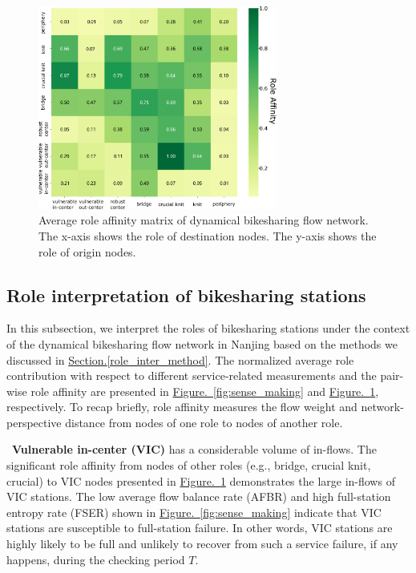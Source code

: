 \documentclass[a4paper,fleqn]{cas-sc}
\begin{document}
\begin{figure}[!htb]
  \centering
  \includegraphics[width=0.7\textwidth]{figs/bikesharing_role_affinity.pdf}
  \caption{Average role affinity matrix of dynamical bikesharing flow network. The x-axis shows the role of destination nodes. The y-axis shows the role of origin nodes.}\label{fig:bikesharing_role_affinity}
\end{figure}


\subsection{Role interpretation of bikesharing stations}
In this subsection, we interpret the roles of bikesharing stations under the context of the dynamical bikesharing flow network in Nanjing based on the methods we discussed in \hyperref[role_inter_method]{Section.\ref{role_inter_method}}. The normalized average role contribution with respect to different service-related measurements and the pair-wise role affinity are presented in \hyperref[fig:role_bikesharing]{Figure.~\ref{fig:sense_making}} and \hyperref[fig:bikesharing_role_affinity]{Figure.~\ref{fig:bikesharing_role_affinity}}, respectively. To recap briefly, role affinity measures the flow weight and network-perspective distance from nodes of one role to nodes of another role.\newline

\noindent \textbullet \, \textbf{Vulnerable in-center (VIC)} has a considerable volume of in-flows. The significant role affinity from nodes of other roles (e.g., bridge, crucial knit, crucial) to VIC nodes presented in \hyperref[fig:bikesharing_role_affinity]{Figure.~\ref{fig:bikesharing_role_affinity}} demonstrates the large in-flows of VIC stations. The low average flow balance rate (AFBR) and high full-station entropy rate (FSER) shown in \hyperref[fig:role_bikesharing]{Figure.~\ref{fig:sense_making}} indicate that VIC stations are susceptible to full-station failure. In other words, VIC stations are highly likely to be full and unlikely to recover from such a service failure, if any happens, during the checking period $T$.\newline
\end{document}
